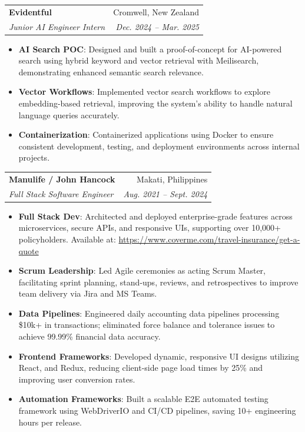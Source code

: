 \documentclass[letterpaper,11pt]{article}
\makeatletter
\newcommand{\resumeItem}[2]{
  \item\small{
    \textbf{#1}{: #2 \vspace{-2pt}}
  }
}
\newcommand{\resumeSubheading}[4]{
  \vspace{-1pt}\item
    \begin{tabular*}{0.97\textwidth}{l@{\extracolsep{\fill}}r}
      \textbf{#1} & #2 \\
      \textit{\small#3} & \textit{\small #4} \\
    \end{tabular*}\vspace{-5pt}
}
\newcommand{\resumeItemListStart}{\begin{itemize}}
\newcommand{\resumeItemListEnd}{\end{itemize}\vspace{-5pt}}
\makeatother
\begin{document}
    \resumeSubheading
      {Evidentful}{Cromwell, New Zealand}
      {Junior AI Engineer Intern}{Dec. 2024 -- Mar. 2025}
      \resumeItemListStart
        \resumeItem{AI Search POC}
          {Designed and built a proof-of-concept for AI-powered search using hybrid keyword and vector retrieval with Meilisearch, demonstrating enhanced semantic search relevance.}
        \resumeItem{Vector Workflows}
          {Implemented vector search workflows to explore embedding-based retrieval, improving the system's ability to handle natural language queries accurately.}
        \resumeItem{Containerization}
          {Containerized applications using Docker to ensure consistent development, testing, and deployment environments across internal projects.}
      \resumeItemListEnd

    \resumeSubheading
      {Manulife / John Hancock}{Makati, Philippines}
      {Full Stack Software Engineer}{Aug. 2021 -- Sept. 2024}
      \resumeItemListStart
        \resumeItem{Full Stack Dev}
          {Architected and deployed enterprise-grade features across microservices, secure APIs, and responsive UIs, supporting over 10,000+ policyholders. Available at: \url{https://www.coverme.com/travel-insurance/get-a-quote}}
        \resumeItem{Scrum Leadership}
          {Led Agile ceremonies as acting Scrum Master, facilitating sprint planning, stand-ups, reviews, and retrospectives to improve team delivery via Jira and MS Teams.}
        \resumeItem{Data Pipelines}
          {Engineered daily accounting data pipelines processing \$10k+ in transactions; eliminated force balance and tolerance issues to achieve 99.99\% financial data accuracy.}
        \resumeItem{Frontend Frameworks}
          {Developed dynamic, responsive UI designs utilizing React, and Redux, reducing client-side page load times by 25\% and improving user conversion rates.}
        \resumeItem{Automation Frameworks}
          {Built a scalable E2E automated testing framework using WebDriverIO and CI/CD pipelines, saving 10+ engineering hours per release.}
      \resumeItemListEnd
\end{document}
